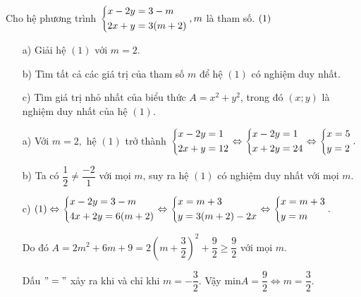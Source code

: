 \begin{ex}%
    Cho hệ phương trình $\left\{\begin{aligned}& x-2y=3-m\\ & 2x+y = 3(m+2)\end{aligned}\right., m$ là tham số. $\hfill(1)$	
    \begin{enumerate}
        \item[a)] Giải hệ $(1)$ với $m = 2$.
        \item[b)] Tìm tất cả các giá trị của tham số $m$ để hệ $(1)$ có nghiệm duy nhất.
        \item[c)] Tìm giá trị nhỏ nhất của biểu thức $A= x^2+y^2$, trong đó $(x;y)$ là nghiệm duy nhất của hệ $(1)$.
    \end{enumerate}
\loigiai
    {
    \begin{enumerate}
        \item[a)] Với $m = 2,$ hệ $(1)$ trở thành $\left\{\begin{aligned}& x-2y=1 \\ & 2x+y=12\end{aligned}\right. \Leftrightarrow
 \left\{\begin{aligned}& x-2y=1 \\ & x+2y=24\end{aligned}\right.
\Leftrightarrow \left\{\begin{aligned}& x =5 \\ & y=2\end{aligned}\right..$
        \item[b)] Ta có $\dfrac{1}{2} \ne \dfrac{-2}{1}$ với mọi $m$, suy ra hệ $(1)$ có nghiệm duy nhất với mọi $m$.
       \item[c)] $(1) \Leftrightarrow \left\{\begin{aligned}& x-2y=3-m \\ & 4x+2y=6(m+2)\end{aligned}\right. \Leftrightarrow \left\{\begin{aligned}& x = m+3 \\ & y = 3(m+2)-2x\end{aligned}\right. \Leftrightarrow \left\{\begin{aligned}& x = m+3 \\ & y=m\end{aligned}\right..  $

Do đó $A = 2m^2+6m+9 = 2\left(m+\dfrac{3}{2}\right)^2+\dfrac{9}{2} \ge \dfrac{9}{2}$ với mọi $m$.

Dấu $"="$ xảy ra khi và chỉ khi $m = -\dfrac{3}{2}.$ Vậy $\mathrm{min}A=\dfrac{9}{2} \Leftrightarrow m = \dfrac{3}{2}.$
    \end{enumerate}
    }
\end{ex}
